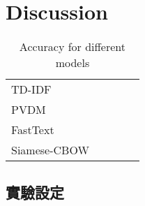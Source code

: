 \chapter{Discussion}

\begin{table}[]
\centering
\caption{Accuracy for different  models}
\label{my-label}
\begin{tabular}{lllll}
TD-IDF &  &  &  &  \\
PVDM &  &  &  &  \\
FastText &  &  &  &  \\
Siamese-CBOW &  &  &  & 
\end{tabular}
\end{table}

\section{實驗設定}
